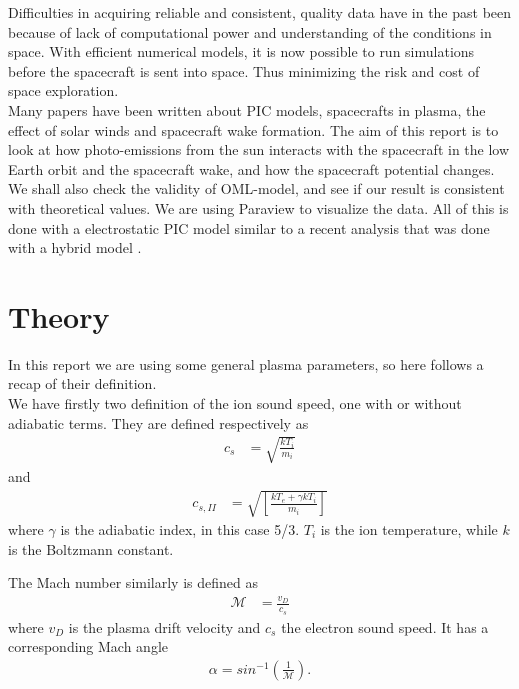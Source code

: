 \documentclass[aip, 
rsi, 
amsmath,
amssymb,
longbibliography,
preprint]{revtex4-1}
\begin{document}
Difficulties in acquiring reliable and consistent, quality data have in the past been because of lack of computational power and understanding of the conditions in space. With efficient numerical models, it is now possible to run simulations before the spacecraft is sent into space. Thus minimizing the risk and cost of space exploration. \\

Many papers have been written about PIC models, spacecrafts in plasma, the effect of solar winds and spacecraft wake formation. The aim of this report is to look at how photo-emissions from the sun interacts with the spacecraft in the low Earth orbit and the spacecraft wake, and how the spacecraft potential changes. We shall also check the validity of OML-model, and see if our result is consistent with theoretical values. We are using Paraview to visualize the data. All of this is done with a electrostatic PIC model similar to a recent analysis that was done with a hybrid model \cite{P7}.

\section{\label{sec:theory} Theory}

In this report we are using some general plasma parameters, so here follows a recap of their definition.\\

We have firstly two definition of the ion sound speed, one with or without adiabatic terms. They are defined respectively as 
\begin{align}
c_s &= \sqrt{\frac{k T_i}{m_i}}\label{eq:IonSpeed}
\end{align}
and
\begin{align}
c_{s,II} &= \sqrt{\left[ \frac{kT_e + \gamma k T_i}{m_i}\right]}\label{eq:IonSpeed2}
\end{align}
where $\gamma$ is the adiabatic index, in this case 5/3. $T_i$ is the ion temperature, while $k$ is the Boltzmann constant.

The Mach number similarly is defined as
\begin{align}
\mathcal{M} &= \frac{v_D}{c_s}\label{eq:Mach}
\end{align}
where $v_D$ is the plasma drift velocity and $c_s$ the electron sound speed. It has a corresponding Mach angle
\begin{align}
\alpha = sin^{-1}(\frac{1}{\mathcal{M}})\label{eq:MachAngle}.
\end{align}
\end{document}
